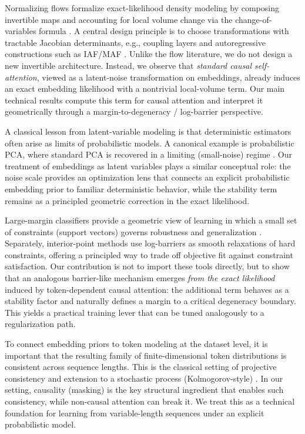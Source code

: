 \documentclass[11pt]{article}
\begin{document}
Normalizing flows formalize exact-likelihood density modeling by composing invertible maps and
accounting for local volume change via the change-of-variables formula
\citep{PapamakariosNaReMoLa21}. A central design principle is to choose transformations with
tractable Jacobian determinants, e.g., coupling layers \citep{DinhSoBe17} and autoregressive
constructions such as IAF/MAF \citep{KingmaSaJoChSuWe16,PapamakariosPaMu17}.
Unlike the flow literature, we do not design a new invertible architecture. Instead, we observe
that \emph{standard causal self-attention}, viewed as a latent-noise transformation on
embeddings, already induces an exact embedding likelihood with a nontrivial local-volume term.
Our main technical results compute this term for causal attention and interpret it geometrically
through a margin-to-degeneracy / log-barrier perspective.

A classical lesson from latent-variable modeling is that deterministic estimators often arise as
limits of probabilistic models. A canonical example is probabilistic PCA, where standard PCA
is recovered in a limiting (small-noise) regime \citep{TippingBi99}. Our treatment of embeddings
as latent variables plays a similar conceptual role: the noise scale provides an optimization
lens that connects an explicit probabilistic embedding prior to familiar deterministic behavior,
while the stability term remains as a principled geometric correction in the exact likelihood.

Large-margin classifiers provide a geometric view of learning in which a small set of
constraints (support vectors) governs robustness and generalization \citep{CortesVa95}.
Separately, interior-point methods use log-barriers as smooth relaxations of hard constraints,
offering a principled way to trade off objective fit against constraint satisfaction.
Our contribution is not to import these tools directly, but to show that an analogous barrier-like
mechanism emerges \emph{from the exact likelihood} induced by token-dependent causal attention:
the additional term behaves as a stability factor and naturally defines a margin to a critical
degeneracy boundary. This yields a practical training lever that can be tuned analogously to a
regularization path.

To connect embedding priors to token modeling at the dataset level, it is important that the
resulting family of finite-dimensional token distributions is consistent across sequence lengths.
This is the classical setting of projective consistency and extension to a stochastic process
(Kolmogorov-style) \citep{Billingsley95, Kolmogorov33}. In our setting, causality (masking) is the key structural
ingredient that enables such consistency, while non-causal attention can break it. We treat this as a
technical foundation for learning from variable-length sequences under an explicit probabilistic model.
\end{document}
